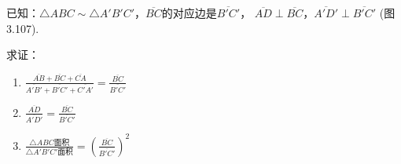 已知：$\triangle ABC\sim \triangle A'B'C'$，$\overline{BC}$的对应边是$\overline{B'C'}$，
$\overline{AD}\perp \overline{BC}$，$\overline{A'D'}\perp \overline{B'C'}$ (图3.107).
\begin{figure}
    \centering
\begin{tikzpicture}
\end{tikzpicture}
    \caption{}
\end{figure}

求证： \begin{enumerate}
    \item $\frac{\overline{AB} + \overline{BC} +\overline{CA}}{\overline{A'B'} + \overline{B'C'} +\overline{C'A'}}=\frac{\overline{BC}}{\overline{B'C'}}$
    \item $\frac{\overline{AD}}{\overline{A'D'}}=\frac{\overline{BC}}{\overline{B'C'}}$
    \item $\frac{\triangle ABC\text{面积}}{\triangle A'B'C'\text{面积}}=\left(\frac{\overline{BC}}{\overline{B'C'}}\right)^2$
\end{enumerate}

